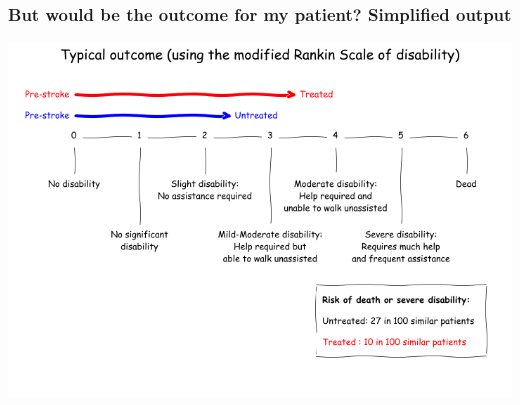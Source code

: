 \begin{frame}
\frametitle{But would be the outcome for my patient? Simplified output}

\vspace{5mm}

\begin{center}
\includegraphics[width=1.0\textwidth]{./images_outcome/short_outcome_1}
\end{center}


\end{frame}
